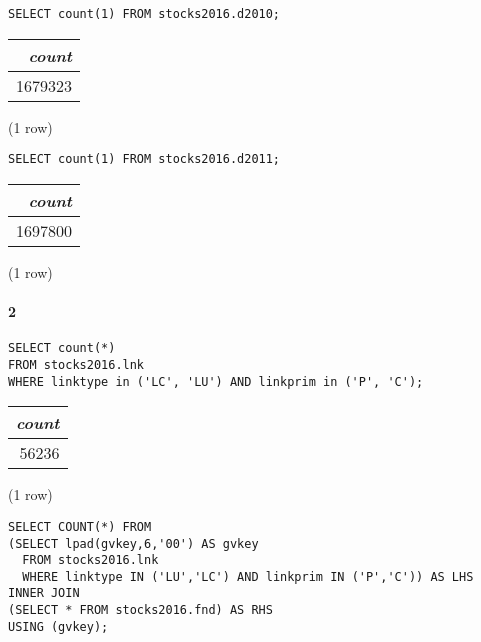 \documentclass[]{article}
\let\oldparagraph\paragraph
\renewcommand{\paragraph}[1]{\oldparagraph{#1}\mbox{}}
\begin{document}
\color{blue}
\begin{verbatim}
SELECT count(1) FROM stocks2016.d2010;
\end{verbatim}
\color{black}

\begin{center}
\begin{tabular}{r}
\textit{count} \\
\hline
1679323 \\
\end{tabular}

\noindent (1 row) \\
\end{center}

\color{blue}
\begin{verbatim}
SELECT count(1) FROM stocks2016.d2011;
\end{verbatim}
\color{black}

\begin{center}
\begin{tabular}{r}
\textit{count} \\
\hline
1697800 \\
\end{tabular}

\noindent (1 row) \\
\end{center}

\paragraph{2} 

\color{blue}
\begin{verbatim}
SELECT count(*)
FROM stocks2016.lnk
WHERE linktype in ('LC', 'LU') AND linkprim in ('P', 'C');
\end{verbatim}
\color{black}

\begin{center}
\begin{tabular}{r}
\textit{count} \\
\hline
56236 \\
\end{tabular}

\noindent (1 row) \\
\end{center}

\color{blue}
\begin{verbatim}
SELECT COUNT(*) FROM
(SELECT lpad(gvkey,6,'00') AS gvkey
  FROM stocks2016.lnk
  WHERE linktype IN ('LU','LC') AND linkprim IN ('P','C')) AS LHS
INNER JOIN
(SELECT * FROM stocks2016.fnd) AS RHS
USING (gvkey);
\end{verbatim}
\color{black}
\end{document}
